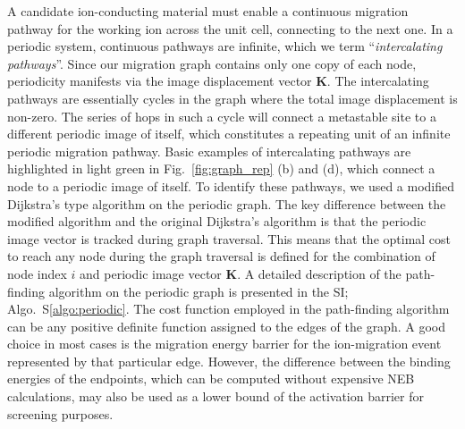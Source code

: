\documentclass[reprint,preprintnumbers,amsmath,amssymb,aps,prl]{revtex4-1}
\begin{document}
A candidate ion-conducting material must enable a continuous migration pathway for the working ion across the unit cell, connecting to the next one. In a periodic system, continuous pathways are infinite, which we term ``{\it intercalating pathways}''.
Since our migration graph contains only one copy of each node, periodicity manifests via the image displacement vector $\mathbf{K}$. 
The intercalating pathways are essentially cycles in the graph where the total image displacement is non-zero.
The series of hops in such a cycle will connect a metastable site to a different periodic image of itself, which constitutes a repeating unit of an infinite periodic migration pathway.
Basic examples of intercalating pathways are highlighted in light green in Fig.~\ref{fig:graph_rep} (b) and (d), which connect a node to a periodic image of itself.
To identify these pathways, we used a modified Dijkstra's type algorithm on the periodic graph. 
The key difference between the modified algorithm and the original Dijkstra's algorithm is that the periodic image vector is tracked during graph traversal. This means that the optimal cost to reach any node during the graph traversal is defined for the combination of node index $i$ and periodic image vector $\mathbf{K}$. A detailed description of the path-finding algorithm on the periodic graph is presented in the SI; Algo.~S\ref{algo:periodic}.
The cost function employed in the path-finding algorithm can be any positive definite function assigned to the edges of the graph. A good choice in most cases is the migration energy barrier for the ion-migration event represented by that particular edge.  However, the difference between the binding energies of the endpoints, which can be computed without expensive NEB calculations, may also be used as a lower bound of the activation barrier for screening purposes.



\end{document}
